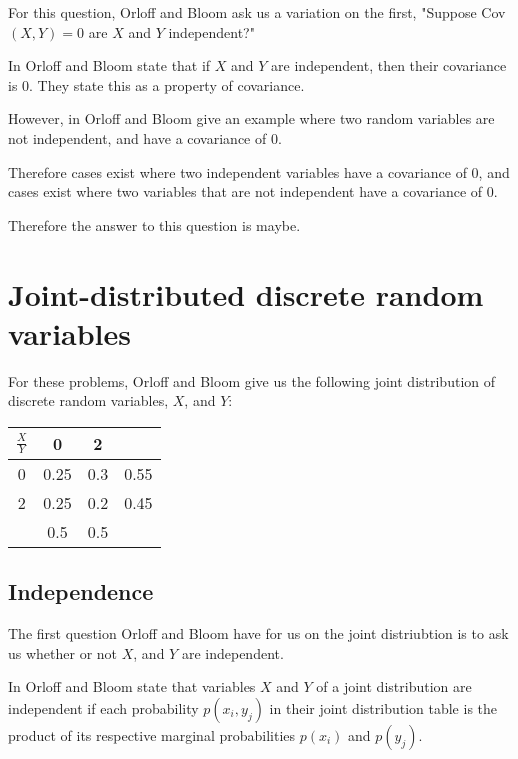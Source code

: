 \documentclass[a4paper,11pt]{article}
\begin{document}
For this question, Orloff and Bloom ask us a variation on the first, "Suppose
Cov$\left(X, Y\right)=0$ are $X$ and $Y$ independent?"

In \cite{reading7b} Orloff and Bloom state that if $X$ and $Y$ are independent,
then their covariance is 0.  They state this as a property of covariance.

However, in \cite{reading7b} Orloff and Bloom give an example where two
random variables are not independent, and have a covariance of $0$.

Therefore cases exist where two independent variables have a covariance of $0$,
and cases exist where two variables that are not independent have a covariance
of $0$.

Therefore the answer to this question is maybe.

\section{Joint-distributed discrete random variables}
For these problems, Orloff and Bloom give us the following joint distribution
of discrete random variables, $X$, and $Y$:

\begin{center}
  \begin{tabular}{ | c | c | c | c |}
    \hline
    $\frac{X}{Y}$ & 0    & 2   &      \\ \hline
    0             & 0.25 & 0.3 & 0.55 \\ \hline
    2             & 0.25 & 0.2 & 0.45 \\ \hline
                  & 0.5  & 0.5 &      \\ \hline
  \end{tabular}
\end{center}

\subsection{Independence}

The first question Orloff and Bloom have for us on the joint distriubtion is
to ask us whether or not $X$, and $Y$ are independent.

In \cite{reading7b} Orloff and Bloom state that variables $X$ and $Y$ of a
joint distribution are independent if each probability
$p \left(x_i, y_j \right)$ in their joint distribution table is the product of
its respective marginal probabilities
$p\left(x_i \right)$ and $p\left(y_j \right)$.
\end{document}
